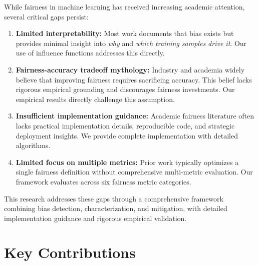 \documentclass[11pt,a4paper,oneside]{report}
\begin{document}
While fairness in machine learning has received increasing academic attention, several critical gaps persist:

\begin{enumerate}

\item \textbf{Limited interpretability:} Most work documents that bias exists but provides minimal insight into \textit{why} and \textit{which training samples drive it}. Our use of influence functions addresses this directly.

\item \textbf{Fairness-accuracy tradeoff mythology:} Industry and academia widely believe that improving fairness requires sacrificing accuracy. This belief lacks rigorous empirical grounding and discourages fairness investments. Our empirical results directly challenge this assumption.

\item \textbf{Insufficient implementation guidance:} Academic fairness literature often lacks practical implementation details, reproducible code, and strategic deployment insights. We provide complete implementation with detailed algorithms.

\item \textbf{Limited focus on multiple metrics:} Prior work typically optimizes a single fairness definition without comprehensive multi-metric evaluation. Our framework evaluates across six fairness metric categories.

\end{enumerate}

This research addresses these gaps through a comprehensive framework combining bias detection, characterization, and mitigation, with detailed implementation guidance and rigorous empirical validation.

\section{Key Contributions}
\end{document}

